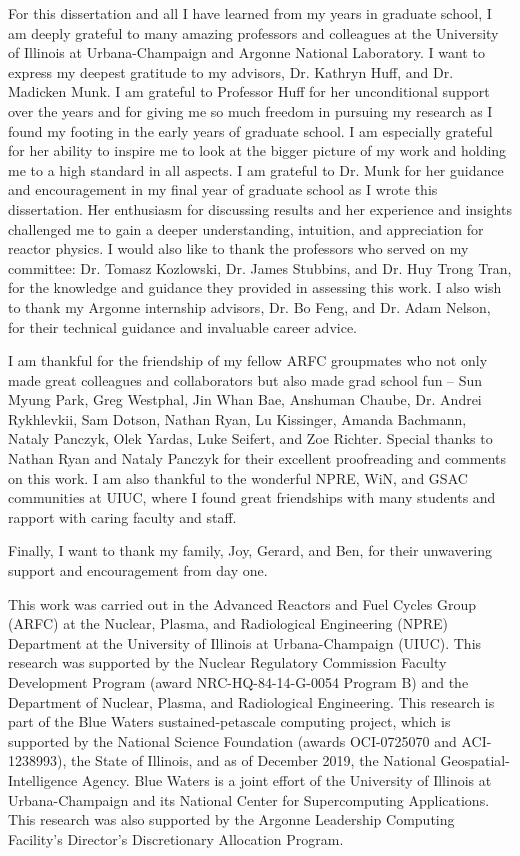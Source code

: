 For this dissertation and all I have learned from my years in graduate school, 
I am deeply grateful to many amazing professors and colleagues at the University of 
Illinois at Urbana-Champaign and Argonne National Laboratory. 
I want to express my deepest gratitude to my advisors, Dr. Kathryn Huff, and Dr. 
Madicken Munk. 
I am grateful to Professor Huff for her unconditional support over the years and for 
giving me so much freedom in pursuing my research as I found my footing in the early 
years of graduate school. 
I am especially grateful for her ability to inspire me to look at the bigger picture of 
my work and holding me to a high standard in all aspects.
I am grateful to Dr. Munk for her guidance and encouragement in my final year 
of graduate school as I wrote this dissertation. 
Her enthusiasm for discussing results and her experience and insights challenged me to 
gain a deeper understanding, intuition, and appreciation for reactor physics.  
I would also like to thank the professors who served on my committee: Dr. Tomasz 
Kozlowski, Dr. James Stubbins, and Dr. Huy Trong Tran, for the knowledge and guidance 
they provided in assessing this work. 
I also wish to thank my Argonne internship advisors, Dr. Bo Feng, and Dr. Adam Nelson, 
for their technical guidance and invaluable career advice. 

I am thankful for the friendship of my fellow ARFC 
groupmates who not only made great colleagues and collaborators but also made 
grad school fun -- Sun Myung Park, Greg Westphal, Jin Whan Bae, Anshuman Chaube, 
Dr. Andrei Rykhlevkii, Sam Dotson, Nathan Ryan, Lu Kissinger, Amanda Bachmann, 
Nataly Panczyk, Olek Yardas, Luke Seifert, and Zoe Richter. 
Special thanks to Nathan Ryan and Nataly Panczyk for their excellent proofreading 
and comments on this work. 
I am also thankful to the wonderful NPRE, WiN, and GSAC communities at UIUC, where 
I found great friendships with many students and rapport with caring faculty and staff. 

Finally, I want to thank my family, Joy, Gerard, and Ben, for their unwavering support 
and encouragement from day one. 

This work was carried out in the Advanced Reactors and Fuel Cycles Group (ARFC) at the 
Nuclear, Plasma, and Radiological Engineering (NPRE) Department at the University of 
Illinois at Urbana-Champaign (UIUC). 
This research was supported by the Nuclear Regulatory Commission Faculty Development 
Program (award NRC-HQ-84-14-G-0054 Program B) and the Department of Nuclear, Plasma, 
and Radiological Engineering.
This research is part of the Blue Waters sustained-petascale computing project, 
which is supported by the National Science Foundation (awards OCI-0725070 and 
ACI-1238993), the State of Illinois, and as of December 2019, the National 
Geospatial-Intelligence Agency. 
Blue Waters is a joint effort of the University of Illinois at Urbana-Champaign and 
its National Center for Supercomputing Applications.
This research was also supported by the Argonne Leadership Computing Facility's 
Director's Discretionary Allocation Program. 